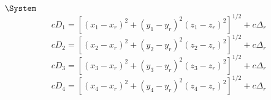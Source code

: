 \documentclass[]{article}
\title{}
\author{}
\begin{document}
\maketitle

\begin{abstract}

\end{abstract}

\section{}
$\System$
\begin{displaymath}
cD_{1}=[(x_{1}-x_{r})^{2}+(y_{1}-y_{r})^{2}(z_{1}-z_{r})^{2}]^{1/2}+c\Delta_{r}
\end{displaymath}
\begin{displaymath}
cD_{2}=[(x_{2}-x_{r})^{2}+(y_{2}-y_{r})^{2}(z_{2}-z_{r})^{2}]^{1/2}+c\Delta_{r}
\end{displaymath}
\begin{displaymath}
cD_{3}=[(x_{3}-x_{r})^{2}+(y_{3}-y_{r})^{2}(z_{3}-z_{r})^{2}]^{1/2}+c\Delta_{r}
\end{displaymath}
\begin{displaymath}
cD_{4}=[(x_{4}-x_{r})^{2}+(y_{4}-y_{r})^{2}(z_{4}-z_{r})^{2}]^{1/2}+c\Delta_{r}
\end{displaymath}
\end{document}
